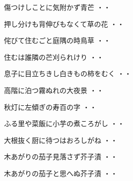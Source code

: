 \begin{shiika}傷つけしことに気附かず青芒
\hfill{・・}\end{shiika}
\vspace{0.6cm}
\begin{shiika}押し分けも背伸びもなくて草の花
\hfill{・・}\end{shiika}
\vspace{0.6cm}
\begin{shiika}侘びて住むごと庭隅の時鳥草
\hfill{・・}\end{shiika}
\vspace{0.6cm}
\begin{shiika}住むは誰隣の芒刈られけり
\hfill{・・}\end{shiika}
\vspace{0.6cm}
\begin{shiika}息子に目立ちきし白きもの柿をむく
\hfill{・・}\end{shiika}
\vspace{0.6cm}
\begin{shiika}高階に泊つ霧ぬれの大夜景
\hfill{・・}\end{shiika}
\vspace{0.6cm}
\begin{shiika}秋灯に左傾ぎの寿百の字
\hfill{・・}\end{shiika}
\vspace{0.6cm}
\begin{shiika}ふる里や菜飯に小芋の煮ころがし
\hfill{・・}\end{shiika}
\vspace{0.6cm}
\begin{shiika}大根抜く厨に待つはおろしがね
\hfill{・・}\end{shiika}
\vspace{0.6cm}
\begin{shiika}木あがりの茄子見落さず芥子漬
\hfill{・・}\end{shiika}
\vspace{0.6cm}
\begin{shiika}木あがりの茄子と思へぬ芥子漬
\hfill{・・}\end{shiika}
\vspace{0.6cm}
